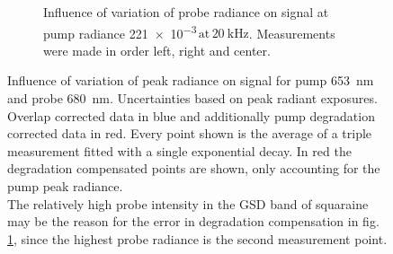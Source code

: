 \documentclass[twoside,openright]{scrreprt}
\def\frep#1{\ensuremath{\,\mathrm{at}\, \SI{#1}{\kilo\hertz}}}
\begin{document}
\begin{figure}[hbtp]
\begin{subfigure}[t]{0.5\linewidth}
\caption{Influence of variation of probe radiance on signal at pump radiance \SI{221e-3}{\radExp}\frep{20}. Measurements were made in order left, right and center.\label{fig:PowerVarProbe}}
\end{subfigure}
\caption{Influence of variation of peak radiance on signal for pump \SI{653}{\nano\meter} and probe \SI{680}{\nano\meter}. Uncertainties based on peak radiant exposures.
Overlap corrected data in blue and additionally pump degradation corrected data in red. Every point shown is the average of a triple measurement fitted with a single exponential decay. In red the degradation compensated points are shown, only accounting for the pump peak radiance.\\ The relatively high probe intensity in the GSD band of squaraine  may be the reason for the error in degradation compensation in fig. \ref{fig:PowerVarProbe}, since the highest probe radiance is the second measurement point. \label{fig:PowerVarRaw}}
\end{figure}
\end{document}
